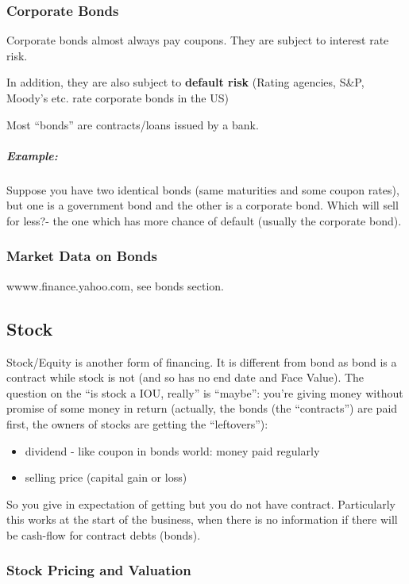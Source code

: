 \documentclass{scrartcl}
\newcommand{\example}{\subparagraph{Example:}} %
\begin{document}
\subsubsection{Corporate Bonds }
\label{sec:CorporateBonds}

Corporate bonds almost always pay coupons. They are subject to interest rate
risk.

In addition, they are also subject to {\bf default risk} (Rating agencies, S\&P,
Moody's etc. rate corporate bonds in the US)

Most ``bonds'' are contracts/loans issued by a bank.

\example Suppose you have two identical bonds (same maturities and some coupon
rates), but one is a government bond and the other is a corporate bond. Which
will sell for less?- the one which has more chance of default (usually the
corporate bond).

\subsubsection{Market Data on Bonds}
\label{sec:MarketDataOnBonds}

wwww.finance.yahoo.com, see bonds section.

\subsection{Stock}
\label{sec:StockEquity}

Stock/Equity is another form of financing. It is different from bond as bond is
a contract while stock is not (and so has no end date and Face Value). The
question on the ``is stock a IOU, really'' is ``maybe'': you're giving money
without promise of some money in return (actually, the bonds (the ``contracts'')
are paid first, the owners of stocks are getting the ``leftovers''):
\begin{itemize}
\item dividend - like coupon in bonds world: money paid regularly
\item selling price (capital gain or loss)
\end{itemize}

So you give in expectation of getting but you do not have contract. Particularly
this works at the start of the business, when there is no information if there
will be cash-flow for contract debts (bonds).

\subsubsection{Stock Pricing and Valuation}
\label{sec:StockPricingValuation}
\end{document}
